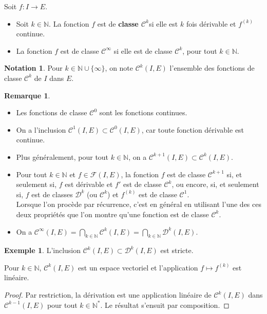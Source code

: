 \documentclass[french]{article}
\newcommand{\N}{\mathbb{N}}
\newcommand{\st}{^*}
\theoremstyle{plain}
\theoremstyle{definition}
\newtheorem*{ex}{Exemple}
\newtheorem*{rmq}{Remarque}
\newtheorem*{notation}{Notation}
\theoremstyle{remark}
\begin{document}
\begin{dfn}
	Soit $f:I\to E$.
	\begin{itemize}
		\item Soit $k\in\N$. La fonction $f$ est de \textbf{classe $\mathcal{C}^k$}si elle est $k$ fois dérivable et $f^{(k)}$ continue.
		\item La fonction $f$ est de classe $\mathcal{C}^\infty$ si elle est de classe $\mathcal{C}^k$, pour tout $k\in\N$.
	\end{itemize}
\end{dfn}

\begin{notation}
	Pour $k\in\N\cup\{\infty\}$, on note $\mathcal{C}^k(I,E)$ l'ensemble des fonctions de classe $\mathcal{C}^k$ de $I$ dans $E$.
\end{notation}

\begin{rmq}
	\begin{itemize}
		\item Les fonctions de classe $\mathcal{C}^0$ sont les fonctions continues.
		\item On a l'inclusion $\mathcal{C}^1(I,E)\subset\mathcal{C}^0(I,E)$, car toute fonction dérivable est continue.
		\item Plus généralement, pour tout $k\in\N$, on a $\mathcal{C}^{k+1}(I,E)\subset\mathcal{C}^k(I,E)$.
		\item Pour tout $k\in\N$ et $f\in\mathcal{F}(I,E)$, la fonction $f$ est de classe $\mathcal{C}^{k+1}$ si, et seulement si, $f$ est dérivable et $f'$ est de classe $\mathcal{C}^k$, ou encore, si, et seulement si, $f$ est de classes $\mathcal{D}^k$ (ou $\mathcal{C}^k$) et $f^{(k)}$ est de classe $\mathcal{C}^1$. \\
		Lorsque l'on procède par récurrence, c'est en général en utilisant l'une des ces deux propriétés que l'on montre qu'une fonction est de classe $\mathcal{C}^k$.
		\item On a $\mathcal{C}^\infty(I,E)=\displaystyle\bigcap_{k\in\N}\mathcal{C}^k(I,E)=\bigcap_{k\in\N}\mathcal{D}^k(I,E)$.
	\end{itemize}
\end{rmq}

\begin{ex}
	L'inclusion $\mathcal{C}^k(I,E)\subset\mathcal{D}^k(I,E)$ est stricte.
\end{ex}

\begin{prop}%
	Pour $k\in\N$, $\mathcal{C}^k(I,E)$ est un espace vectoriel et l'application $f\mapsto f^{(k)}$ est linéaire.
\end{prop}
\begin{proof}
	Par restriction, la dérivation est une application linéaire de $\mathcal{C}^k(I,E)$ dans $\mathcal{C}^{k-1}(I,E)$ pour tout $k\in\N\st$. Le résultat s'ensuit par composition.
\end{proof}
\end{document}
